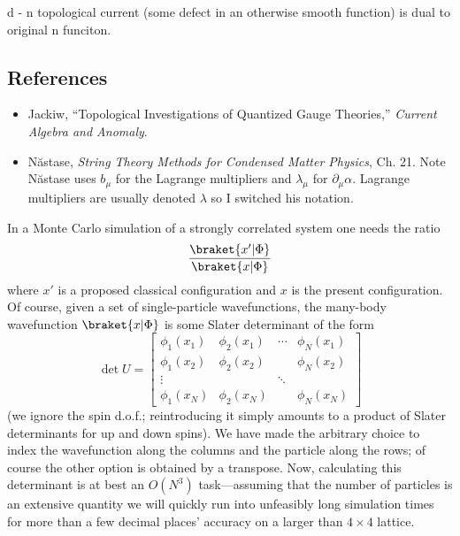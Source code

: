 \documentclass{report}
\begin{document}
d - n topological current (some defect in an otherwise smooth function) is dual 
to original n funciton.


\subsection*{References} 
\begin{itemize}[itemsep=0.2ex]
\item Jackiw, ``Topological Investigations of Quantized Gauge Theories,''
	\textit{Current Algebra and Anomaly}.
\item N\u astase, \textit{String Theory Methods for Condensed Matter Physics}, Ch. 21. 
	Note N\u astase uses $ b_\mu $ for the Lagrange multipliers and $ \lambda_\mu $
	for $ \partial_\mu \alpha $. Lagrange multipliers are usually denoted $ \lambda $
	so I switched his notation.
\end{itemize}


In a Monte Carlo simulation of a strongly correlated system one needs the 
ratio 
\begin{equation*}
	\frac{\braket{x'\vert\Phi}}{\braket{x\vert\Phi}}
\end{equation*}
where $ x' $ is a proposed classical configuration and $ x $ is the present 
configuration. Of course, given a set of single-particle wavefunctions, the 
many-body wavefunction $ \braket{x\vert \Phi} $ is some Slater determinant 
of the form 
\begin{equation*}
	\det U = 
	\begin{bmatrix}
		\phi_1(x_1) & \phi_2(x_1) & \cdots & \phi_N(x_1)\\ 
		\phi_1(x_2) & \phi_2(x_2) &        & \phi_N(x_2)\\ 
		\vdots      &             & \ddots &            \\ 
		\phi_1(x_N) & \phi_2(x_N) &        & \phi_N(x_N)
	\end{bmatrix}
\end{equation*}
(we ignore the spin d.o.f.; reintroducing it simply amounts to a product of 
Slater determinants for up and down spins). We have made the arbitrary choice 
to index the wavefunction along the columns and the particle along the rows; 
of course the other option is obtained by a transpose. Now, calculating this 
determinant is at best an $ O(N^3) $ task---assuming that the number of particles 
is an extensive quantity we will quickly run into unfeasibly long simulation 
times for more than a few decimal places' accuracy on a larger than $ 4\times 4 $
lattice. 
\end{document}
